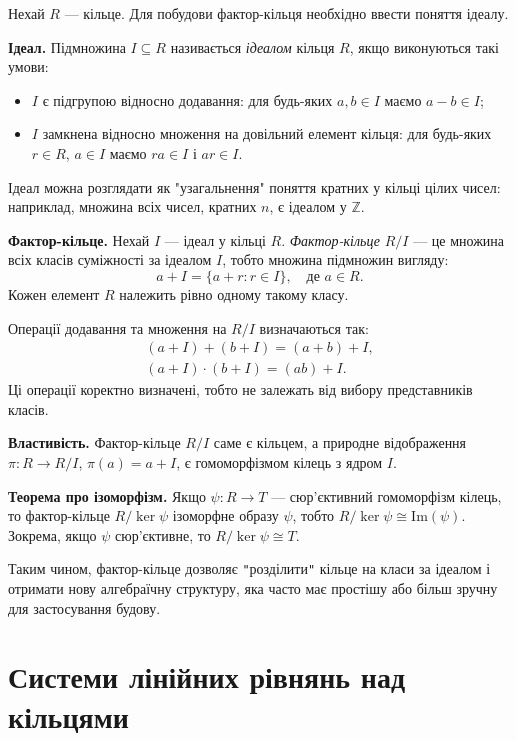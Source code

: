 Нехай \(R\) — кільце. Для побудови фактор-кільця необхідно ввести поняття ідеалу.

\textbf{Ідеал.} Підмножина \(I \subseteq R\) називається \emph{ідеалом} кільця \(R\), якщо виконуються такі умови:
\begin{itemize}
    \item \(I\) є підгрупою відносно додавання: для будь-яких \(a, b \in I\) маємо \(a-b \in I\);
    \item \(I\) замкнена відносно множення на довільний елемент кільця: для будь-яких \(r \in R\), \(a \in I\) маємо \(ra \in I\) і \(ar \in I\).
\end{itemize}
Ідеал можна розглядати як "узагальнення" поняття кратних у кільці цілих чисел: наприклад, множина всіх чисел, кратних \(n\), є ідеалом у \(\mathbb{Z}\).

\textbf{Фактор-кільце.} Нехай \(I\) — ідеал у кільці \(R\). \emph{Фактор-кільце} \(R/I\) — це множина всіх класів суміжності за ідеалом \(I\), тобто множина підмножин вигляду:
\[
    a + I = \{a + r : r \in I\}, \quad \text{де } a \in R.
\]
Кожен елемент \(R\) належить рівно одному такому класу.

Операції додавання та множення на \(R/I\) визначаються так:
\begin{gather*}
    (a + I) + (b + I) = (a + b) + I, \\
    (a + I) \cdot (b + I) = (ab) + I.
\end{gather*}
Ці операції коректно визначені, тобто не залежать від вибору представників класів.

\textbf{Властивість.} Фактор-кільце \(R/I\) саме є кільцем, а природне відображення \(\pi: R \to R/I\), \(\pi(a) = a + I\), є гомоморфізмом кілець з ядром \(I\).

\textbf{Теорема про ізоморфізм.} Якщо \(\psi: R \to T\) — сюр’єктивний гомоморфізм кілець, то фактор-кільце \(R/\ker\psi\) ізоморфне образу \(\psi\), тобто \(R/\ker\psi \cong \mathrm{Im}(\psi)\). Зокрема, якщо \(\psi\) сюр’єктивне, то \(R/\ker\psi \cong T\).

Таким чином, фактор-кільце дозволяє \texttt{"}розділити\texttt{"} кільце на класи за ідеалом і отримати нову алгебраїчну структуру, яка часто має простішу або більш зручну для застосування будову.

\section{Системи лінійних рівнянь над кільцями}
\label{sec:sle_theory}

